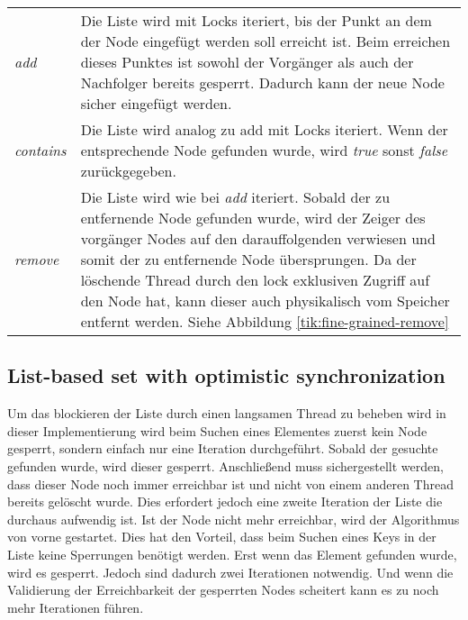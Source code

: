 \begin{table}[H]
    \begin{tabularx}{\textwidth}{lX}
		\textit{add} & Die Liste wird mit Locks iteriert, bis der Punkt an dem der Node eingefügt werden soll erreicht ist. Beim erreichen dieses Punktes ist sowohl der Vorgänger als auch der Nachfolger bereits gesperrt. Dadurch kann der neue Node sicher eingefügt werden.\\
		\textit{contains} & Die Liste wird analog zu add mit Locks iteriert. 
		Wenn der entsprechende Node gefunden wurde, wird \textit{true} sonst \textit{false} zurückgegeben. \\
		\textit{remove} & Die Liste wird wie bei \textit{add} iteriert. Sobald der zu entfernende Node gefunden wurde, wird der Zeiger des vorgänger Nodes
		auf den darauffolgenden verwiesen und somit der zu entfernende Node übersprungen. Da der löschende Thread durch den lock exklusiven Zugriff auf den Node hat, kann dieser auch physikalisch vom Speicher entfernt werden. 
		Siehe Abbildung \ref{tik:fine-grained-remove}\\
    \end{tabularx}
\end{table}


\subsection{List-based set with optimistic synchronization}

Um das blockieren der Liste durch einen langsamen Thread zu beheben wird in dieser Implementierung wird beim Suchen eines Elementes zuerst kein Node gesperrt, sondern einfach nur eine Iteration durchgeführt. 
Sobald der gesuchte gefunden wurde, wird dieser gesperrt. Anschließend muss sichergestellt werden, dass dieser Node noch immer erreichbar ist 
und nicht von einem anderen Thread bereits gelöscht wurde. Dies erfordert jedoch eine zweite Iteration der Liste die durchaus aufwendig ist. Ist der Node nicht mehr erreichbar, wird der Algorithmus von vorne gestartet. Dies hat den Vorteil, dass beim Suchen eines Keys in der Liste keine Sperrungen benötigt werden. 
Erst wenn das Element gefunden wurde, wird es gesperrt. Jedoch sind dadurch zwei Iterationen notwendig. Und wenn die Validierung der Erreichbarkeit der gesperrten Nodes scheitert kann es zu noch mehr Iterationen führen.

